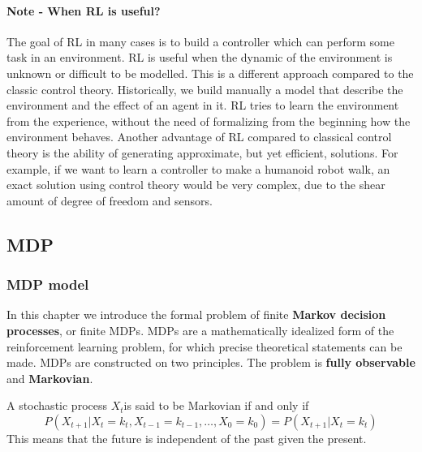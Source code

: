 \documentclass[../main.tex]{subfiles}
\begin{document}
\paragraph{Note - When RL is useful?} The goal of RL in many cases is to build a controller which can perform some task in an environment. RL is useful when the dynamic of the environment is unknown or difficult to be modelled. This is a different approach compared to the classic control theory. Historically, we build manually a model that describe the environment and the effect of an agent in it. RL tries to learn the environment from the experience, without the need of formalizing from the beginning how the environment behaves. Another advantage of RL compared to classical control theory is the ability of generating approximate, but yet efficient, solutions. For example, if we want to learn a controller to make a humanoid robot walk, an exact solution using control theory would be very complex, due to the shear amount of degree of freedom and sensors.

\subsection{MDP}
\subsubsection{MDP model}
In this chapter we introduce the formal problem of finite \textbf{Markov decision processes}, or finite MDPs. MDPs are a mathematically idealized form of the reinforcement learning problem, for which precise theoretical statements can be made. MDPs are constructed on two principles. The problem is \textbf{fully observable} and \textbf{Markovian}.
\begin{definition}
    A stochastic process $X_t$\footnotemark is said to be Markovian if and only if 
    \begin{equation*}
        P(X_{t+1}|X_t=k_t,X_{t-1}=k_{t-1}, \dots, X_0=k_0) = P(X_{t+1}|X_{t}=k_t)
    \end{equation*}
    This means that the future is independent of the past given the present.
\end{definition}
\end{document}
